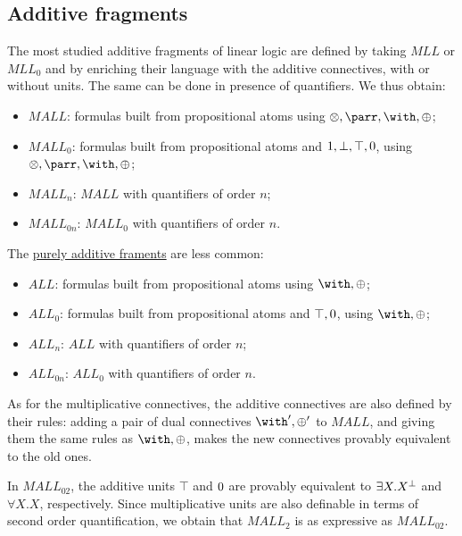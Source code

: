 \subsection{Additive fragments}\label{additive-fragments}

The most studied additive fragments of linear logic are defined by
taking \(MLL\) or \(MLL_0\) and by enriching their language with the
additive connectives, with or without units. The same can be done in
presence of quantifiers. We thus obtain:

\begin{itemize}
\tightlist
\item
  \(MALL\): formulas built from propositional atoms using
  \(\tens,\parr,\with,\plus\);
\item
  \(MALL_0\): formulas built from propositional atoms and
  \(1,\bot,\top,0\), using \(\tens,\parr,\with,\plus\);
\item
  \(MALL_n\): \(MALL\) with quantifiers of order \(n\);
\item
  \(MALL_{0n}\): \(MALL_0\) with quantifiers of order \(n\).
\end{itemize}

The \href{Additive_linear_logic}{purely additive framents} are less
common:

\begin{itemize}
\tightlist
\item
  \(ALL\): formulas built from propositional atoms using
  \(\with,\plus\);
\item
  \(ALL_0\): formulas built from propositional atoms and \(\top,0\),
  using \(\with,\plus\);
\item
  \(ALL_n\): \(ALL\) with quantifiers of order \(n\);
\item
  \(ALL_{0n}\): \(ALL_0\) with quantifiers of order \(n\).
\end{itemize}

As for the multiplicative connectives, the additive connectives are also
defined by their rules: adding a pair of dual connectives
\(\with',\plus'\) to \(MALL\), and giving them the same rules as
\(\with,\plus\), makes the new connectives provably equivalent to the
old ones.

In \(MALL_{02}\), the additive units \(\top\) and \(0\) are provably
equivalent to \(\exists X.X^\bot\) and \(\forall X.X\), respectively.
Since multiplicative units are also definable in terms of second order
quantification, we obtain that \(MALL_2\) is as expressive as
\(MALL_{02}\).

